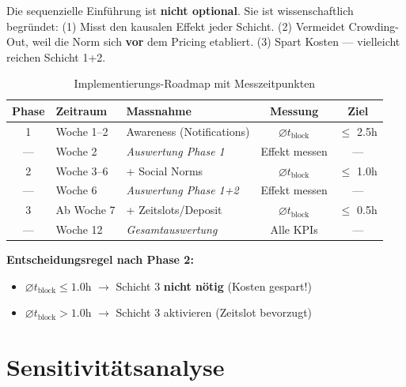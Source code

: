 \documentclass[11pt,a4paper]{article}
\begin{document}
\begin{keyinsight}
Die sequenzielle Einf\"uhrung ist \textbf{nicht optional}. Sie ist wissenschaftlich begr\"undet: (1) Misst den kausalen Effekt jeder Schicht. (2) Vermeidet Crowding-Out, weil die Norm sich \textbf{vor} dem Pricing etabliert. (3) Spart Kosten --- vielleicht reichen Schicht 1+2.
\end{keyinsight}

\begin{table}[H]
\centering
{}
\begin{tabular}{cllcc}
\toprule
\textbf{\color{fadarkblue}Phase} & \textbf{\color{fadarkblue}Zeitraum} & \textbf{\color{fadarkblue}Massnahme} & \textbf{\color{fadarkblue}Messung} & \textbf{\color{fadarkblue}Ziel} \\
\midrule
1 & Woche 1--2 & Awareness (Notifications) & $\varnothing t_{\text{block}}$ & $\leq$ 2.5h \\
--- & Woche 2 & \textit{Auswertung Phase 1} & Effekt messen & --- \\
2 & Woche 3--6 & + Social Norms & $\varnothing t_{\text{block}}$ & $\leq$ 1.0h \\
--- & Woche 6 & \textit{Auswertung Phase 1+2} & Effekt messen & --- \\
3 & Ab Woche 7 & + Zeitslots/Deposit & $\varnothing t_{\text{block}}$ & $\leq$ 0.5h \\
--- & Woche 12 & \textit{Gesamtauswertung} & Alle KPIs & --- \\
\bottomrule
\end{tabular}
\caption{Implementierungs-Roadmap mit Messzeitpunkten}
\end{table}

\textbf{Entscheidungsregel nach Phase 2:}
\begin{itemize}[noitemsep]
\item $\varnothing t_{\text{block}} \leq 1.0$h $\rightarrow$ Schicht 3 \textbf{nicht n\"otig} (Kosten gespart!)
\item $\varnothing t_{\text{block}} > 1.0$h $\rightarrow$ Schicht 3 aktivieren (Zeitslot bevorzugt)
\end{itemize}


\section{Sensitivit\"atsanalyse}
\end{document}
